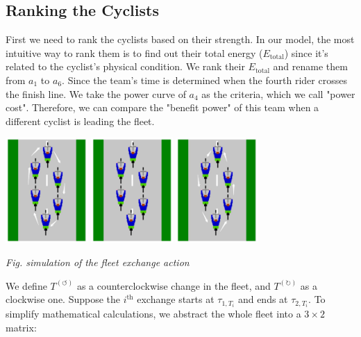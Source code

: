\documentclass{article}
\begin{document}
		\subsection{Ranking the Cyclists}
			First we need to rank the cyclists based on their strength. In our model, the most intuitive way to rank them is to find out their total energy ($E_\mathrm{total}$) since it's related to the cyclist's physical condition. We rank their $E_\mathrm{total}$ and rename them from $a_1$ to $a_6$. Since the team's time is determined when the fourth rider crosses the finish line. We take the power curve of $a_4$ as the criteria, which we call "power cost". Therefore, we can compare the "benefit power" of this team when a different cyclist is leading the fleet.
			\begin{center}
				\includegraphics[height = 4cm]{clockwise.jpg}
				\includegraphics[height = 4cm]{fleet actions.png}
				\includegraphics[height = 4cm]{counterclockwise.jpg}

				\small\textit{Fig. simulation of the fleet exchange action}
			\end{center}
				We define \(T^{\left( \circlearrowleft \right)}\) as a counterclockwise change in the fleet, and \(T^{\left( \circlearrowright \right)}\) as a clockwise one. Suppose the \(i^{\mathrm{th}}\) exchange starts at \(\tau_{1,T_i}\) and ends at \(\tau_{2,T_i}\). To simplify mathematical calculations, we abstract the whole fleet into a \(3\times 2\) matrix:
\end{document}
